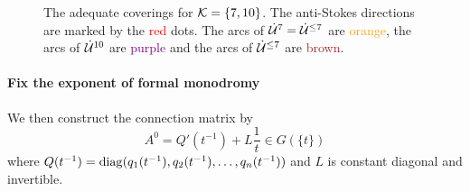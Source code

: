 \begin{figure}
  \caption{The adequate coverings for $\mathcal{K}=\{7,10\}$.
    The anti-Stokes directions are marked by the \textcolor{red}{red} dots.
    The arcs of $\dot{\mathcal{U}}^{7}=\dot{\mathcal{U}}^{\leq7}$ are
    \textcolor{orange}{orange}, the arcs of $\dot{\mathcal{U}}^{10}$ are
    \textcolor{purple}{purple} and the arcs of $\dot{\mathcal{U}}^{\leq7}$ are
    \textcolor{brown}{brown}.
  }\label{fig:adequateCovering}
\end{figure}%

\paragraph{Fix the exponent of formal monodromy}
We then construct the connection matrix by
  \[
    A^0=Q'(t^{-1})+L\frac{1}{t} \in G(\!\{t\}\!)
  \]
where $Q(t^{-1})=\operatorname{diag}(q_1(t^{-1}),q_2(t^{-1}),\dots,q_n(t^{-1}))$ and $L$ is
constant diagonal and invertible.

